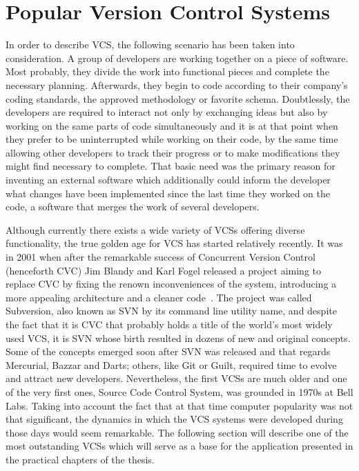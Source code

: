 \section{Popular Version Control Systems}\label{sec:popular_vcs}
In order to describe VCS, the following scenario has been taken into consideration. A group of developers are working together on a piece of software. Most probably, they divide the work into functional pieces and complete the necessary planning. Afterwards, they begin to code according to their company's coding standards, the approved methodology or favorite schema. Doubtlessly, the developers are required to interact not only by exchanging ideas but also by working on the same parts of code simultaneously and it is at that point when they prefer to be uninterrupted while working on their code, by the same time allowing other developers to track their progress or to make modifications they might find necessary to complete. That basic need was the primary reason for inventing an external software which additionally could inform the developer what changes have been implemented since the last time they worked on the code, a software that merges the work of several developers. 

Although currently there exists a wide variety of VCSs offering diverse functionality, the true golden age for VCS has started relatively recently. It was in 2001 when after the remarkable success of Concurrent Version Control (henceforth CVC) Jim Blandy and Karl Fogel released a project aiming to replace CVC by fixing the renown inconveniences of the system, introducing a more appealing architecture and a cleaner code~\cite[page 11]{hg_book}. The project was called Subversion, also known as SVN by its command line utility name, and despite the fact that it is CVC that probably holds a title of the world's most widely used VCS, it is SVN whose birth resulted in dozens of new and original concepts. Some of the concepts emerged soon after SVN was released and that regards Mercurial, Bazzar and Darts; others, like Git or Guilt, required time to evolve and attract new developers. Nevertheless, the first VCSs are much older and one of the very first ones, Source Code Control System, was grounded in 1970s at Bell Labs. Taking into account the fact that at that time computer popularity was not that significant, the dynamics in which the VCS systems were developed during those days would seem remarkable. The following section will describe one of the most outstanding VCSs which will serve as a base for the application presented in the practical chapters of the thesis.


